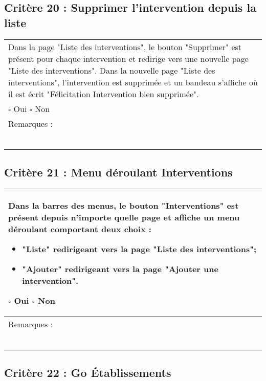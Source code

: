   		
  		
  			\subsection*{Critère 20 : Supprimer l'intervention depuis la liste}
	
	\begin{center}
    	 		\begin{tabular}[h]{|p{}|}
			\hline
				Dans la page "Liste des interventions", le bouton "Supprimer" est présent pour chaque intervention et redirige vers une nouvelle page "Liste des interventions". Dans la nouvelle page "Liste des interventions", l'intervention est supprimée et un bandeau s'affiche où il est écrit "Félicitation Intervention bien supprimée".
				\\
				$\square$ Oui  \hfill \hfill $\square$ Non \\\hline Remarques : \\ ~\\
			 \\\hline
     		\end{tabular}
  		\end{center}

  		
  			\subsection*{Critère 21 : Menu déroulant Interventions}
	
	\begin{center}
    	 		\begin{tabular}[h]{|p{}|}
			\hline
				Dans la barres des menus, le bouton "Interventions" est présent depuis n'importe quelle page et affiche un menu déroulant comportant deux choix :  
				\begin{itemize}
					\item "Liste" redirigeant vers la page "Liste des interventions";
					\item "Ajouter" redirigeant vers la page "Ajouter une intervention".
				\end{itemize}
				$\square$ Oui  \hfill \hfill $\square$ Non \\\hline Remarques : \\ ~\\
			 \\\hline
     		\end{tabular}
  		\end{center}
  		
  		
  		  	\subsection*{Critère 22 : Go Établissements}
	
